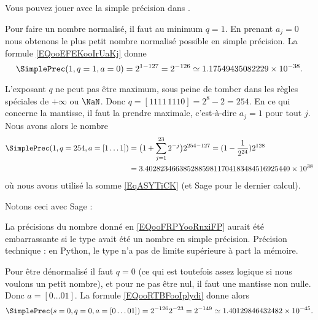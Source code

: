Vous pouvez jouer avec la simple précision dans \cite{ooOSFYooHCgMRL}.

\begin{example}
	Pour faire un nombre normalisé, il faut au minimum \( q=1\). En prenant \( a_j=0\) nous obtenons le plus petit nombre normalisé possible en simple précision. La formule \eqref{EQooEFEKooIrUaKj} donne
	\begin{equation}
		\SimplePrec(1,q=1,a=0)=2^{1-127}=2^{-126}\simeq 1.17549435082229\times 10^{-38}.
	\end{equation}
\end{example}

\begin{example}
	L'exposant \( q\) ne peut pas être maximum, sous peine de tomber dans les règles spéciales de \( +\infty\) ou \( \NaN\). Donc \( q=[1111\,1110]=2^{8}-2=254\). En ce qui concerne la mantisse, il faut la prendre maximale, c'est-à-dire \( a_j=1\) pour tout \( j\). Nous avons alors le nombre
	\begin{subequations}
		\begin{align}
			\SimplePrec(1,q=254,a=[1\ldots 1]) & =\big( 1+\sum_{j=1}^{23}2^{-j} \big)2^{254-127}=(1-\frac{1}{ 2^{24} })2^{128}     \\
			                                   & =3.40282346638528859811704183484516925440\times 10^{38}  \label{EQooFRPYooRnxiFP}
		\end{align}
	\end{subequations}
	où nous avons utilisé la somme \eqref{EqASYTiCK} (et Sage pour le dernier calcul).
\end{example}

Notons ceci avec Sage :


La précisions du nombre donné en \eqref{EQooFRPYooRnxiFP} aurait été embarrassante si le type avait été un nombre en simple précision. Précision technique : en Python, le type  n'a pas de limite supérieure à part la mémoire.

\begin{example}
	Pour être dénormalisé il faut \( q=0\) (ce qui est toutefois assez logique si nous voulons un petit nombre), et pour ne pas être nul, il faut une mantisse non nulle. Donc \( a=[0\ldots 01]\). La formule \eqref{EQooRTBFooIplydi} donne alors
	\begin{equation}
		\SimplePrec(s=0,q=0,a=[0\ldots 01])=2^{-126}2^{-23}=2^{-149}\simeq 1.40129846432482\times 10^{-45}.
	\end{equation}
\end{example}

